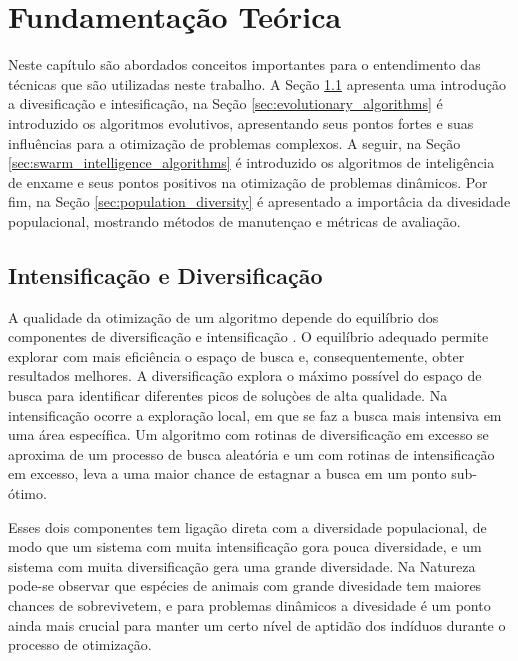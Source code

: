 \chapter{Fundamentação Teórica}
\label{ch:fundamentos}

Neste capítulo são abordados conceitos importantes para o entendimento das técnicas que são utilizadas neste trabalho. A Seção \ref{sec:intesification_diversification} apresenta uma introdução a divesificação e intesificação, na Seção \ref{sec:evolutionary_algorithms} é introduzido os algoritmos evolutivos, apresentando seus pontos fortes e suas influências para a otimização de problemas complexos. A seguir, na Seção \ref{sec:swarm_intelligence_algorithms} é introduzido os algoritmos de inteligência de enxame e seus pontos positivos na otimização de problemas dinâmicos. Por fim, na Seção \ref{sec:population_diversity} é apresentado a importâcia da divesidade populacional, mostrando métodos de manutençao e métricas de avaliação.

\section{Intensificação e Diversificação}
\label{sec:intesification_diversification}

A qualidade da otimização de um algoritmo depende do equilíbrio dos componentes de diversificação e intensificação \cite{vcrepinvsek2013exploration}. O equilíbrio adequado permite explorar com mais eficiência o espaço de busca e, consequentemente, obter resultados melhores. A diversificação explora o máximo possível do espaço de busca para identificar diferentes picos de soluçòes de alta qualidade. Na intensificação ocorre a exploração local, em que se faz a busca mais intensiva em uma área específica. Um algoritmo com rotinas de diversificação em excesso se aproxima de um processo de busca aleatória e um com rotinas de intensificação em excesso, leva a uma maior chance de estagnar a busca em um ponto sub-ótimo. 

Esses dois componentes tem ligação direta com a diversidade populacional, de modo que um sistema com muita intensificação gora pouca diversidade, e um sistema com muita diversificação gera uma grande diversidade. Na Natureza pode-se observar que espécies de animais com grande divesidade tem maiores chances de sobrevivetem, e para problemas dinâmicos a divesidade é um ponto ainda mais crucial para manter um certo nível de aptidão dos indíduos durante o processo de otimização.

